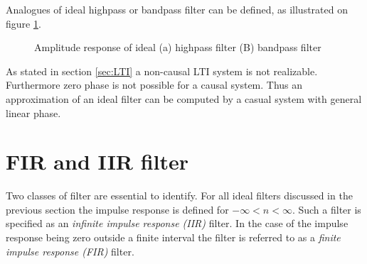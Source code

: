 Analogues of ideal highpass or bandpass filter can be defined, as illustrated on figure \ref{fig:ideal}.\\ 

\begin{figure}[H]
\begin{subfigure}[b]{0.50\textwidth}
        \centering
{}

\caption{}
    \end{subfigure}
 \begin{subfigure}[b]{0.50\textwidth}
        \centering  
{}
\caption{}
    \end{subfigure}
\caption{Amplitude response of ideal (a) highpass filter (B) bandpass filter}
\label{fig:ideal}
\end{figure}
As stated in section \ref{sec:LTI} a non-causal LTI system is not realizable. Furthermore  zero phase is not possible for a causal system.
Thus an approximation of an ideal filter can be computed by a casual system with general linear phase.    

\section{FIR and IIR filter} 
Two classes of filter are essential to identify.
For all ideal filters discussed in the previous section the impulse response is defined for $-\infty < n < \infty$. Such a filter is specified as an \textit{infinite impulse response (IIR)} filter. In the case of the impulse response being zero outside a finite interval the filter is referred to as a \textit{finite impulse response (FIR)} filter. 
